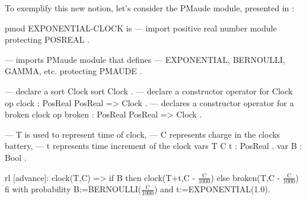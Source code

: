 \begin{example}
\normalfont
To exemplify this new notion, let's consider the PMaude module, presented in \cite{Agha2006}: \\
\begin{maude}[mathescape=true]
pmod EXPONENTIAL-CLOCK is
  --- import positive real number module
  protecting POSREAL .

  --- imports PMaude module that defines
  --- EXPONENTIAL, BERNOULLI, GAMMA, etc.
  protecting PMAUDE .

  --- declare a sort Clock
  sort Clock .
  --- declare a constructor operator for Clock
  op clock : PosReal PosReal => Clock .
  --- declares a constructor operator for a broken clock
  op broken : PosReal PosReal => Clock .

  --- T is used to represent time of clock,
  --- C represents charge in the clocks battery,
  --- t represents time increment of the clock
  vars T C t : PosReal . var B : Bool .
  
  rl [advance]: clock(T,C) =>
                      if B then
                           clock(T+t,C - $\frac{\text{C}}{1000}$)
                      else
                           broken(T,C - $\frac{\text{C}}{1000}$)
                      fi
                with probability B:=BERNOULLI($\frac{\text{C}}{1000}$) 
                                and 
                                t:=EXPONENTIAL(1.0).
                

\end{maude}
\end{example}
